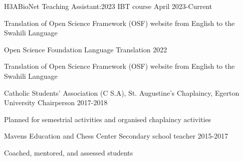 

\begin{cventries}
   \cventry
    {H3ABioNet} %
    {Teaching Assistant:2023 IBT course} %
    {} %
    {April 2023-Current} %
    {
      \begin{cvitems} %
        \item {Translation of Open Science Framework (OSF) website from English to the Swahili Language}
      \end{cvitems}
    }
  \cventry
    {Open Science Foundation} %
    {Language Translation} %
    {} %
    {2022} %
    {
      \begin{cvitems} %
        \item {Translation of Open Science Framework (OSF) website from English to the Swahili Language}
      \end{cvitems}
    }
  \cventry
    {Catholic Students' Association (C S.A), St. Augustine's Chaplaincy, Egerton University} %
    {Chairperson} %
    {} %
    {2017-2018} %
    {
      \begin{cvitems} %
        \item {Planned for semestrial activities and organised chaplaincy activities}
      \end{cvitems}
    }
  \cventry
    {Mavens Education and Chess Center} %
    {Secondary school teacher} %
    {} %
    {2015-2017} %
    {
      \begin{cvitems} %
        \item {Coached, mentored, and assessed students}
      \end{cvitems}
    }


\end{cventries}
